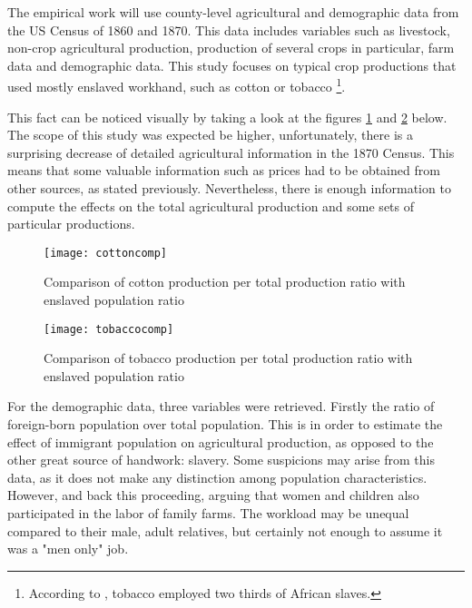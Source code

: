 \documentclass[12pt]{report}
\begin{document}
The empirical work will use county-level agricultural and demographic data from the US Census of 1860 and 1870. This data includes variables such as livestock, non-crop agricultural production, production of several crops in particular, farm data and demographic data. This study focuses on typical crop productions that used mostly enslaved workhand, such as cotton or tobacco \footnote{According to \citet[29]{wright2013slavery}, tobacco employed two thirds of African slaves.}. 

This fact can be noticed visually by taking a look at the figures \ref{fig:cottoncomp} and \ref{fig:tobaccocomp} below. The scope of this study was expected be higher, unfortunately, there is a surprising decrease of detailed agricultural information in the 1870 Census. This means that some valuable information such as prices had to be obtained from other sources, as stated previously. Nevertheless, there is enough information to compute the effects on the total agricultural production and some sets of particular productions.

\begin{figure}[h!]
\centering
\texttt{[image: cottoncomp]} \caption{Comparison of cotton production per total production ratio with enslaved population ratio} \label{fig:cottoncomp}
\end{figure}

\begin{figure}[h!]
\centering
\texttt{[image: tobaccocomp]} \caption{Comparison of tobacco production per total production ratio with enslaved population ratio} \label{fig:tobaccocomp}
\end{figure}


For the demographic data, three variables were retrieved. Firstly the ratio of foreign-born population over total population. This is in order to estimate the effect of immigrant population on agricultural production, as opposed to the other great source of handwork: slavery. Some suspicions may arise from this data, as it does not make any distinction among population characteristics. However, \citet{wright1970economics} and \citet{russel1941effects} back this proceeding, arguing that women and children also participated in the labor of family farms. The workload may be unequal compared to their male, adult relatives, but certainly not enough to assume it was a "men only" job.
\end{document}
